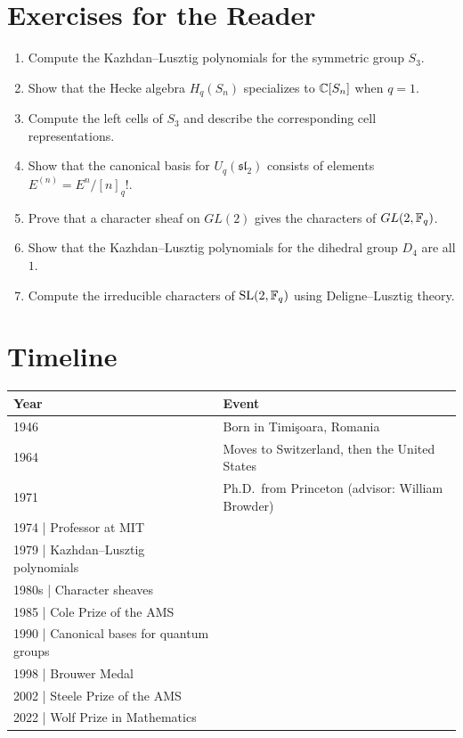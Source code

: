\section*{Exercises for the Reader}

\begin{enumerate}
    \item [I] Compute the Kazhdan--Lusztig polynomials for the symmetric group $S_3$.
    \item [B] Show that the Hecke algebra $H_q(S_n)$ specializes to $\mathbb{C}[S_n]$ when $q = 1$.
    \item [I] Compute the left cells of $S_3$ and describe the corresponding cell representations.
    \item [B] Show that the canonical basis for $U_q(\mathfrak{sl}_2)$ consists of elements $E^{(n)} = E^n/[n]_q!$.
    \item [A] Prove that a character sheaf on $GL(2)$ gives the characters of $GL(2, \mathbb{F}_q)$.
    \item [B] Show that the Kazhdan--Lusztig polynomials for the dihedral group $D_4$ are all $1$.
    \item [A] Compute the irreducible characters of $\operatorname{SL}(2, \mathbb{F}_q)$ using Deligne--Lusztig theory.
\end{enumerate}

\section*{Timeline}

\begin{tabularx}{\linewidth}{|p{1.5cm}|>{\raggedright\arraybackslash}X|}
\hline
\textbf{Year} & \textbf{Event} \\ \hline
1946 & Born in Timi\c{s}oara, Romania \\ \hline
1964 & Moves to Switzerland, then the United States \\ \hline
1971 & Ph.D.\ from Princeton (advisor: William Browder) \\ \hline
1974 | Professor at MIT \\ \hline
1979 | Kazhdan--Lusztig polynomials \\ \hline
1980s | Character sheaves \\ \hline
1985 | Cole Prize of the AMS \\ \hline
1990 | Canonical bases for quantum groups \\ \hline
1998 | Brouwer Medal \\ \hline
2002 | Steele Prize of the AMS \\ \hline
2022 | Wolf Prize in Mathematics \\ \hline
\end{tabularx}

